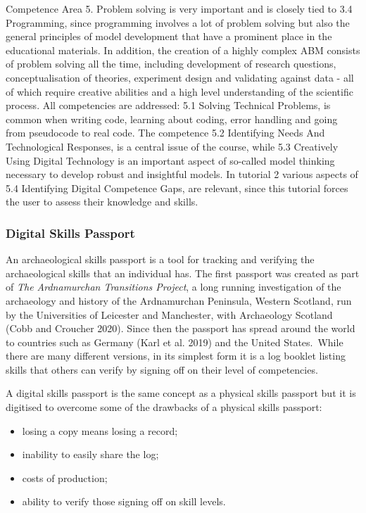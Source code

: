 \documentclass[
]{article}
\begin{document}
Competence Area 5. Problem solving is very important and is closely tied to 3.4 Programming, since programming involves a lot of problem solving but also the general principles of model development that have a prominent place in the educational materials. In addition, the creation of a highly complex ABM consists of problem solving all the time, including development of research questions, conceptualisation of theories, experiment design and validating against data - all of which require creative abilities and a high level understanding of the scientific process. All competencies are addressed: 5.1 Solving Technical Problems, is common when writing code, learning about coding, error handling and going from pseudocode to real code. The competence 5.2 Identifying Needs And Technological Responses, is a central issue of the course, while 5.3 Creatively Using Digital Technology is an important aspect of so-called model thinking necessary to develop robust and insightful models. In tutorial 2 various aspects of 5.4 Identifying Digital Competence Gaps, are relevant, since this tutorial forces the user to assess their knowledge and skills.

\hypertarget{digital-skills-passport}{%
\subsubsection{Digital Skills Passport}\label{digital-skills-passport}}

An archaeological skills passport is a tool for tracking and verifying the archaeological skills that an individual has. The first passport was created as part of \emph{The Ardnamurchan Transitions Project}, a long running investigation of the archaeology and history of the Ardnamurchan Peninsula, Western Scotland, run by the Universities of Leicester and Manchester, with Archaeology Scotland (Cobb and Croucher 2020). Since then the passport has spread around the world to countries such as Germany (Karl et al. 2019) and the United States.~While there are many different versions, in its simplest form it is a log booklet listing skills that others can verify by signing off on their level of competencies.~

A digital skills passport is the same concept as a physical skills passport but it is digitised to overcome some of the drawbacks of a physical skills passport:

\begin{itemize}
\item
  losing a copy means losing a record;
\item
  inability to easily share the log;
\item
  costs of production;
\item
  ability to verify those signing off on skill levels.~
\end{itemize}
\end{document}
